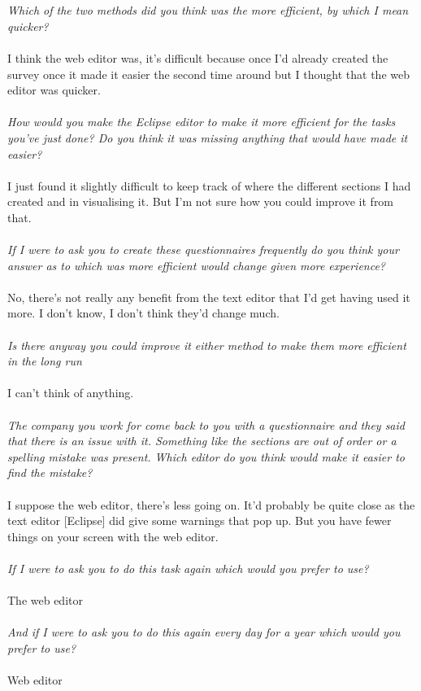 \\
\\
\textit{Which of the two methods did you think was the more efficient, by which I mean quicker?}
\\
\\
I think the web editor was, it's difficult because once I'd already created the survey once it made it easier the second time around but I thought that the web editor was quicker.
\\
\\
\textit{How would you make the Eclipse editor to make it more efficient for the tasks you've just done? Do you think it was missing anything that would have made it easier?}
\\
\\
I just found it slightly difficult to keep track of where the different sections I had created and in visualising it. But I'm not sure how you could improve it from that.
\\
\\
\textit{If I were to ask you to create these questionnaires frequently do you think your answer as to which was more efficient would change given more experience?}
\\
\\
No, there's not really any benefit from the text editor that I'd get having used it more. I don't know, I don't think they'd change much.
\\
\\
\textit{Is there anyway you could improve it either method to make them more efficient in the long run}
\\
\\
I can't think of anything.
\\
\\
\textit{The company you work for come back to you with a questionnaire and they said that there is an issue with it. Something like the sections are out of order or a spelling mistake was present. Which editor do you think would make it easier to find the mistake?}
\\
\\
I suppose the web editor, there's less going on. It'd probably be quite close as the text editor [Eclipse] did give some warnings that pop up. But you have fewer things on your screen with the web editor.
\\
\\
\textit{If I were to ask you to do this task again which would you prefer to use?}
\\
\\
The web editor
\\
\\
\textit{And if I were to ask you to do this again every day for a year which would you prefer to use?}
\\
\\
Web editor


